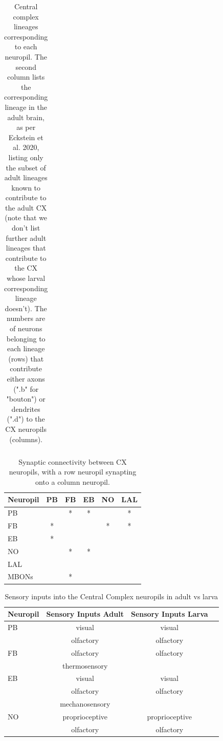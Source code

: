 \documentclass{article}
\begin{document}
\begin{table}
\begin{tabular}{|c|c|cc|cc|cc|cc|}
        \bottomrule
    \end{tabular}
    \caption{Central complex lineages corresponding to each neuropil. The second column lists the corresponding lineage in the adult brain, as per Eckstein et al. 2020, listing only the subset of adult lineages known to contribute to the adult CX (note that we don't list further adult lineages that contribute to the CX whose larval corresponding lineage doesn't). The numbers are of neurons belonging to each lineage (rows) that contribute either axons (".b" for "bouton") or dendrites (".d") to the CX neuropils (columns). }
        \label{lineages}
    \end{table} 

    \begin{table}

    \begin{tabular}{l|ccccc}
        \toprule
        Neuropil & PB & FB & EB & NO & LAL \\
        \midrule
        PB &  & * & * &  & * \\
        FB & * & & & * & * \\
        EB & * & & & & \\
        NO & & * & * & & \\
        LAL & & & & & \\ %
        MBONs & & * & & & \\
        \bottomrule
    \end{tabular}
    
    \caption{Synaptic connectivity between CX neuropils, with a row neuropil synapting onto a column neuropil.}
    \label{inputsoutputs}
    \end{table}
    
    \begin{table}
    \centering
        \begin{tabular}{ lccr } 
         \toprule
         Neuropil &  Sensory Inputs Adult & Sensory Inputs Larva   \\ 
        \midrule
            PB & visual & visual\\
               & olfactory & olfactory \\
        \hline
            FB & olfactory & olfactory \\ 
               & thermosensory        & \\  %
        \hline
            EB &  visual  & visual  \\
               &  olfactory  & olfactory  \\
               &  mechanosensory  &   \\
        \hline
            NO &  proprioceptive  & proprioceptive  \\
              &  olfactory  &  olfactory \\

        \bottomrule
    \end{tabular}
    \caption{Sensory inputs into the Central Complex neuropils in adult vs larva}
    \label{sensoryinputs}
    \end{table}
\end{document}
